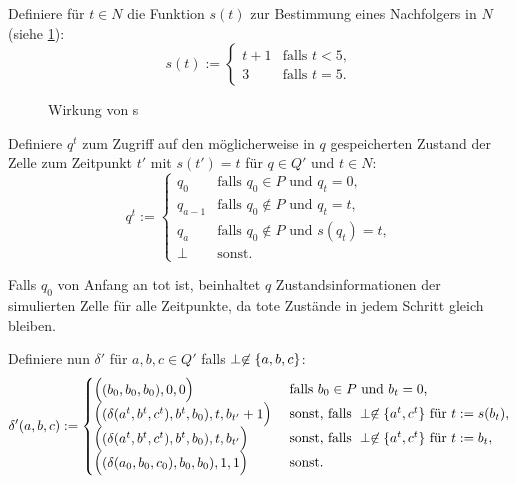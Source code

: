 \begin{definition}
    Definiere für $t \in N$ die Funktion $s(t)$ zur Bestimmung eines Nachfolgers in $N$ (siehe \cref{wirkungVonS}):
    \[
        s(t) :=
        \begin{cases}
            t + 1 & \text{falls } t < 5, \\
            3 & \text{falls } t = 5.
        \end{cases}
    \]
    
    \begin{figure}[h]
        \centering
        
        \caption{Wirkung von s}
        \label{wirkungVonS}
    \end{figure}
    
    
    Definiere $q^t$ zum Zugriff auf den möglicherweise in $q$ gespeicherten Zustand der Zelle zum Zeitpunkt $t'$ mit $s(t') = t$
    für $q \in Q'$ und $t \in N$:
    \[
        q^{t} :=
        \begin{cases}
            q_{0} & \text{falls } q_0 \in P \text{ und } q_t = 0, \\
            q_{a-1} & \text{falls } q_0 \not\in P \text{ und } q_t = t, \\
            q_a & \text{falls } q_0 \not\in P \text{ und } s(q_t) = t, \\
            \perp & \text{sonst.}
        \end{cases}
    \]
    
    Falls $q_0$ von Anfang an tot ist,
    beinhaltet $q$ Zustandsinformationen
    der simulierten Zelle für alle Zeitpunkte,
    da tote Zustände in jedem Schritt gleich bleiben.
    
    Definiere nun $\delta'$ für $a, b, c \in Q'$ falls $\perp \not\in \{ { a, b, c} \}$:
    \[
        \delta'(a, b, c) := 
        \begin{cases}
            \Spvek{(b_0, b_0, b_0), 0, 0}
            & \text{ falls } b_0 \in P \text{ und } b_t = 0, \\
            \Spvek{(\delta(a^t, b^t, c^t), b^t, b_0), t, b_{t'} + 1}
            & \text{ sonst, falls } \perp \not\in \finset{ a^t, c^t } \text{ für } t := s(b_t), \\
            \Spvek{(\delta(a^t, b^t, c^t), b^t, b_0), t, b_{t'}}
            & \text{ sonst, falls } \perp \not\in \finset{a^t, c^t} \text{ für } t := b_t, \\
            \Spvek{(\delta(a_0, b_0, c_0), b_0, b_0), 1, 1}
            & \text{ sonst.}
        \end{cases}
    \]
    

\end{definition}
